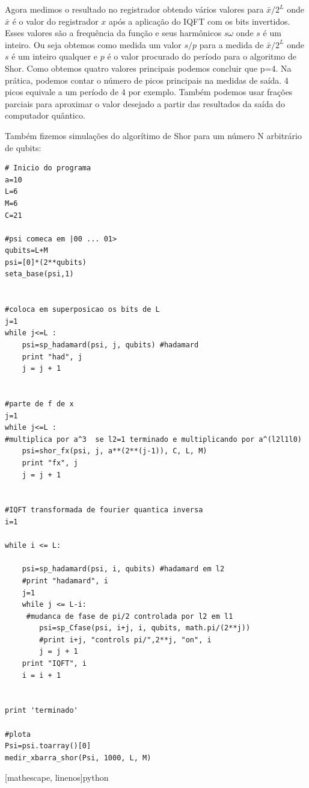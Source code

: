 \documentclass[12pt,a4paper]{article}
\begin{document}
Agora medimos o resultado no registrador obtendo vários valores para $\bar{x}/2^{L}$ onde $\bar{x}$ é o valor do registrador $x$ após a aplicação do IQFT com os bits invertidos. Esses valores são a frequência da função e seus harmônicos $s\omega$ onde $s$ é um inteiro. Ou seja obtemos como medida um valor $s/p$ para a medida de $\bar{x}/2^{L}$ onde $s$ é um inteiro qualquer e $p$ é o valor procurado do período para o algoritmo de Shor. Como obtemos quatro valores principais podemos concluir que p=4. Na prática, podemos contar o número de picos principais na medidas de saída. 4 picos equivale a um período de 4 por exemplo. Também podemos usar frações parciais para aproximar o valor desejado a partir das resultados da saída do computador quântico.



Também fizemos simulações do algorítimo de Shor para um número N arbitrário de qubits:

\begin{verbatim}
# Inicio do programa
a=10
L=6
M=6
C=21

#psi comeca em |00 ... 01>
qubits=L+M
psi=[0]*(2**qubits)
seta_base(psi,1)


#coloca em superposicao os bits de L
j=1
while j<=L :
    psi=sp_hadamard(psi, j, qubits) #hadamard
    print "had", j
    j = j + 1
    

#parte de f de x
j=1
while j<=L :
#multiplica por a^3  se l2=1 terminado e multiplicando por a^(l2l1l0)
    psi=shor_fx(psi, j, a**(2**(j-1)), C, L, M) 
    print "fx", j
    j = j + 1
    

#IQFT transformada de fourier quantica inversa
i=1

while i <= L:
    
    psi=sp_hadamard(psi, i, qubits) #hadamard em l2 
    #print "hadamard", i
    j=1
    while j <= L-i:
     #mudanca de fase de pi/2 controlada por l2 em l1
        psi=sp_Cfase(psi, i+j, i, qubits, math.pi/(2**j))
        #print i+j, "controls pi/",2**j, "on", i
        j = j + 1
    print "IQFT", i
    i = i + 1
    

print 'terminado'

#plota
Psi=psi.toarray()[0]
medir_xbarra_shor(Psi, 1000, L, M)

\end{verbatim}[mathescape, linenos]{python}
\end{document}
